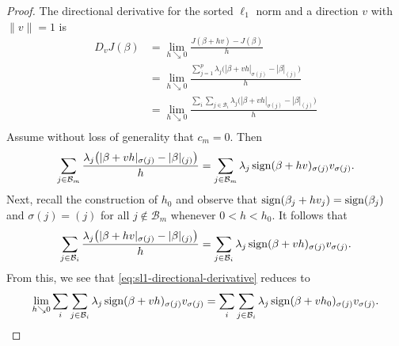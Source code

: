 \begin{proof}
  The directional derivative for the sorted \(\ell_1\) norm and a direction
  \(v\) with \(\lVert v \rVert = 1\)  is
  \begin{equation}
    \label{eq:sl1-directional-derivative}
    \begin{aligned}
      D_v J(\beta) & = \lim_{h \searrow 0} \frac{J(\beta + h v) - J(\beta)}{h}                                                                    \\
                   & = \lim_{h \searrow 0} \frac{\sum_{j=1}^p\lambda_j\big(|\beta + vh|_{\sigma(j)} - |\beta|_{(j)}\big)}{h}                      \\
                   & = \lim_{h \searrow 0}\frac{\sum_i \sum_{j \in \mathcal{B}_i} \lambda_j\big(|\beta + vh|_{\sigma(j)} - |\beta|_{(j)}\big)}{h} \\
    \end{aligned}
  \end{equation}
  Assume without loss of generality that \(c_m = 0\).
  Then
  \[
    \sum_{j \in \mathcal{B}_m}\frac{\lambda_j \big( |\beta + vh|_{\sigma(j)} - |\beta|_{(j)}\big)}{h}
    = \sum_{j \in \mathcal{B}_m} \lambda_j \operatorname{sign}(\beta + hv)_{\sigma(j)}v_{\sigma(j)}.
  \]
  Next, recall the construction of \(h_0\) and
  observe that \(\operatorname{sign}(\beta_j + hv_j) = \operatorname{sign}(\beta_j)\)
  and \(\sigma(j) = (j)\) for all \(j \notin \mathcal{B}_m\) 
  whenever \(0 < h < h_0\).
  It follows that
  \[
    \sum_{j \in \mathcal{B}_i} \frac{\lambda_j\big(|\beta + hv|_{\sigma(j)} - |\beta|_{(j)}\big)}{h}
    = \sum_{j \in \mathcal{B}_i} \lambda_j\operatorname{sign}(\beta + vh)_{\sigma(j)}v_{\sigma(j)}.
  \]
  From this, we see that \eqref{eq:sl1-directional-derivative} reduces to
  \[
    \lim_{h \searrow 0} \sum_i \sum_{j \in \mathcal{B}_i} \lambda_j\operatorname{sign}(\beta + vh)_{\sigma(j)}v_{\sigma(j)}
    = \sum_i \sum_{j \in \mathcal{B}_i} \lambda_j\operatorname{sign}(\beta + vh_0)_{\sigma(j)}v_{\sigma(j)}.
  \]
\end{proof}

